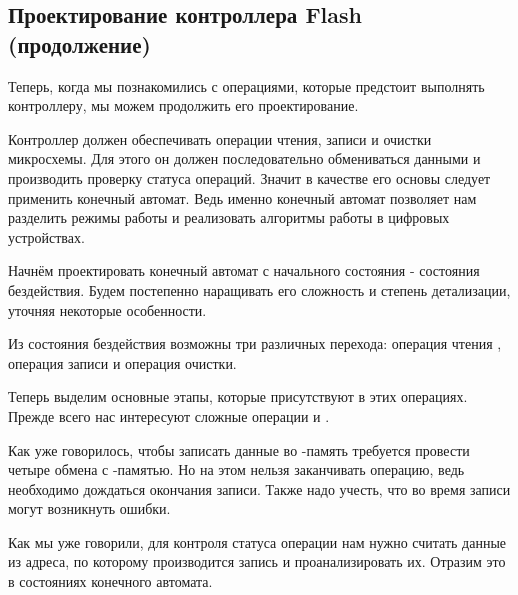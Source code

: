 \subsection{Проектирование контроллера Flash (продолжение)}
\par{Теперь, когда мы познакомились с операциями, которые предстоит выполнять контроллеру, мы можем продолжить его проектирование.}
\par{Контроллер должен обеспечивать операции чтения, записи и очистки микросхемы. Для этого он должен последовательно обмениваться данными и производить проверку статуса операций. Значит в качестве его основы следует применить конечный автомат. Ведь именно конечный автомат позволяет нам разделить режимы работы и реализовать алгоритмы работы в цифровых устройствах.}
\par{Начнём проектировать конечный автомат с начального состояния - состояния бездействия. Будем постепенно наращивать его сложность и степень детализации, уточняя некоторые особенности.}

% 

\par{Из состояния бездействия возможны три различных перехода: операция чтения , операция записи и операция очистки.}

% 

\par{Теперь выделим основные этапы, которые присутствуют в этих операциях. Прежде всего нас интересуют сложные операции  и .}
\par{Как уже говорилось, чтобы записать данные во -память требуется провести четыре обмена с -памятью. Но на этом нельзя заканчивать операцию, ведь необходимо дождаться окончания записи. Также надо учесть, что во время записи могут возникнуть ошибки.}
\par{Как мы уже говорили, для контроля статуса операции нам нужно считать данные из адреса, по которому производится запись и проанализировать их. Отразим это в состояниях конечного автомата.}

